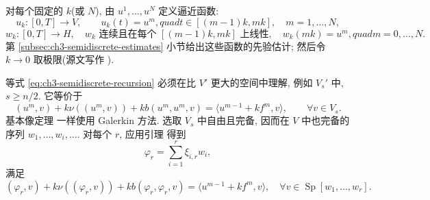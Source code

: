 对每个固定的 $k$(或 $N$), 由 $u^1,\ldots,u^N$ 定义逼近函数:
\begin{equation}
u_k:[0,T]\to V,
\qquad u_k(t)=u^m,quad t\in[(m-1)k,mk],\quad m=1,\ldots,N,
\label{eq:ch3-semidiscrete-piecewise-constant}
\end{equation}
\begin{equation}
w_k:[0,T]\to H,
\quad w_k\text{ 连续且在每个 }[(m-1)k,mk]\text{ 上线性},
\quad w_k(mk)=u^m,quad m=0,\ldots,N.
\label{eq:ch3-semidiscrete-piecewise-linear}
\end{equation}
第 \ref{subsec:ch3-semidiscrete-estimates} 小节给出这些函数的先验估计; 然后令 $k\to0$ 取极限(源文写作 ).

\begin{Proof}
等式 \eqref{eq:ch3-semidiscrete-recursion} 必须在比 $V'$ 更大的空间中理解, 例如 $V_s'$ 中, $s\geq n/2$. 它等价于
\begin{equation}
(u^m,v)+k\nu((u^m,v))+kb(u^m,u^m,v)
=\langle u^{m-1}+kf^m,v\rangle,
\qquad\forall v\in V_s.
\label{eq:ch3-semidiscrete-step-variational}
\end{equation}
基本像定理  一样使用 Galerkin 方法. 选取 $V_s$ 中自由且完备, 因而在 $V$ 中也完备的序列 $w_1,\ldots,w_i,\ldots$. 对每个 $r$, 应用引理  得到
\begin{equation}
\varphi_r=\sum_{i=1}^r\xi_{i,r}w_i,
\label{eq:ch3-semidiscrete-galerkin-phi}
\end{equation}
满足
\begin{equation}
(\varphi_r,v)+k\nu((\varphi_r,v))+kb(\varphi_r,\varphi_r,v)
=\langle u^{m-1}+kf^m,v\rangle,
\quad\forall v\in\operatorname{Sp}[w_1,\ldots,w_r].
\label{eq:ch3-semidiscrete-galerkin-equation}
\end{equation}


\end{Proof}
